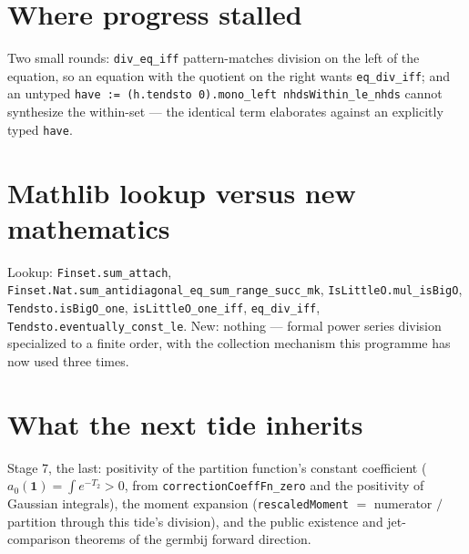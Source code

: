 \documentclass[11pt]{article}
\newcommand{\code}[1]{\texttt{#1}}
\begin{document}
\section{Where progress stalled}

Two small rounds: \code{div\_eq\_iff} pattern-matches division on the
left of the equation, so an equation with the quotient on the right
wants \code{eq\_div\_iff}; and an untyped
\code{have := (h.tendsto 0).mono\_left nhdsWithin\_le\_nhds} cannot
synthesize the within-set --- the identical term elaborates against
an explicitly typed \code{have}.

\section{Mathlib lookup versus new mathematics}

\begin{sloppypar}
Lookup: \code{Finset.sum\_attach},
\code{Finset.Nat.sum\_antidiagonal\_eq\_sum\_range\_succ\_mk},
\code{IsLittleO.mul\_isBigO}, \code{Tendsto.isBigO\_one},
\code{isLittleO\_one\_iff}, \code{eq\_div\_iff},
\code{Tendsto.eventually\_const\_le}. New: nothing --- formal power
series division specialized to a finite order, with the collection
mechanism this programme has now used three times.
\end{sloppypar}

\section{What the next tide inherits}

Stage 7, the last: positivity of the partition function's constant
coefficient ($a_0(\mathbf 1) = \int e^{-T_2} > 0$, from
\code{correctionCoeffFn\_zero} and the positivity of Gaussian
integrals), the moment expansion
(\code{rescaledMoment} $=$ numerator $/$ partition through this
tide's division), and the public existence and jet-comparison
theorems of the germbij forward direction.
\end{document}
